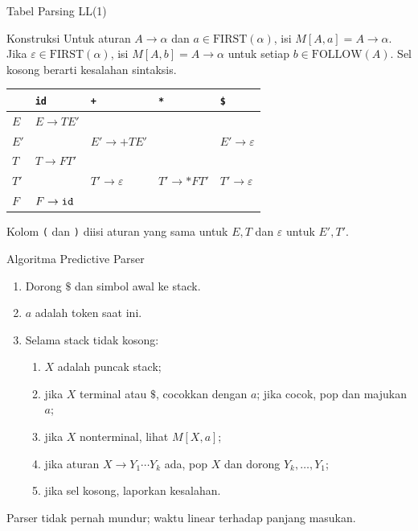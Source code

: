 \documentclass[aspectratio=169,10pt,t]{beamer}
\begin{document}
\begin{frame}{Tabel Parsing LL(1)}
  \begin{block}{Konstruksi}
    \footnotesize
    Untuk aturan \(A \to \alpha\) dan \(a \in \text{FIRST}(\alpha)\),
    isi \(M[A,a]=A \to \alpha\). Jika
    \(\varepsilon \in \text{FIRST}(\alpha)\), isi
    \(M[A,b]=A \to \alpha\) untuk setiap \(b \in \text{FOLLOW}(A)\).
    Sel kosong berarti kesalahan sintaksis.
  \end{block}

  \scriptsize
  \begin{tabular}{@{}l l l l l@{}}
    \toprule
     & \texttt{id} & \texttt{+} & \texttt{*} & \texttt{\$} \\
    \midrule
    \(E\)  & \(E \to TE'\) & & & \\
    \(E'\) & & \(E' \to +TE'\) & & \(E' \to \varepsilon\) \\
    \(T\)  & \(T \to FT'\) & & & \\
    \(T'\) & & \(T' \to \varepsilon\) & \(T' \to *FT'\) &
      \(T' \to \varepsilon\) \\
    \(F\)  & \(F \to \texttt{id}\) & & & \\
    \bottomrule
  \end{tabular}

  \vspace{4pt}
  {\scriptsize Kolom \texttt{(} dan \texttt{)} diisi aturan yang sama
  untuk \(E,T\) dan \(\varepsilon\) untuk \(E',T'\).}
\end{frame}

\begin{frame}{Algoritma Predictive Parser}
  \begin{enumerate}
    \setlength{\itemsep}{1pt}
    \item Dorong \(\$\) dan simbol awal ke stack.
    \item \(a\) adalah token saat ini.
    \item Selama stack tidak kosong:
          \begin{enumerate}
            \item \(X\) adalah puncak stack;
            \item jika \(X\) terminal atau \(\$\), cocokkan dengan
                  \(a\); jika cocok, pop dan majukan \(a\);
            \item jika \(X\) nonterminal, lihat \(M[X,a]\);
            \item jika aturan \(X \to Y_1\cdots Y_k\) ada, pop \(X\)
                  dan dorong \(Y_k,\ldots,Y_1\);
            \item jika sel kosong, laporkan kesalahan.
          \end{enumerate}
  \end{enumerate}

  \vspace{2pt}
  {\footnotesize\color{ubbblue!80}Parser tidak pernah mundur; waktu
  linear terhadap panjang masukan.}
\end{frame}
\end{document}
